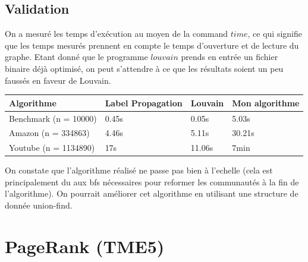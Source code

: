 \documentclass[a4paper]{report}
\begin{document}
\section{Validation}

On a mesuré les temps d'exécution au moyen de la command $time$, ce qui signifie que les temps mesurés prennent en compte le temps d'ouverture et de lecture du graphe. Etant donné que le programme $louvain$ prends en entrée un fichier binaire déjà optimisé, on peut s'attendre à ce que les résultats soient un peu faussés en faveur de Louvain.

\begin{tabular}{|l|l|l|l|}
  \hline
  Algorithme & Label Propagation & Louvain & Mon algorithme\\
  \hline
  Benchmark (n = 10000) & 0.45s & 0.05s & 5.03s\\
  Amazon (n = 334863) & 4.46s & 5.11s & 30.21s\\
  Youtube (n = 1134890) & 17s & 11.06s & 7min\\
  \hline
\end{tabular}

On constate que l'algorithme réalisé ne passe pas bien à l'echelle (cela est principalement du aux bfs nécessaires pour reformer les communautés à la fin de l'algorithme). On pourrait améliorer cet algorithme en utilisant une structure de donnée union-find.

\chapter{PageRank (TME5)}
\end{document}
